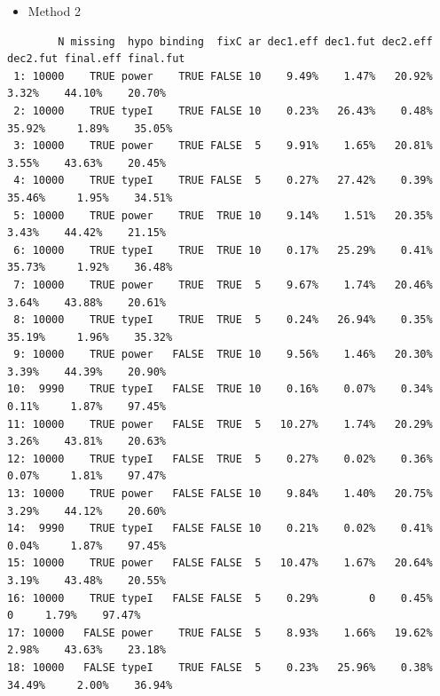 \documentclass[12pt]{article}
\begin{document}
\begin{itemize}
\item Method 2
\end{itemize}
\begin{verbatim}
        N missing  hypo binding  fixC ar dec1.eff dec1.fut dec2.eff dec2.fut final.eff final.fut
 1: 10000    TRUE power    TRUE FALSE 10    9.49%    1.47%   20.92%    3.32%    44.10%    20.70%
 2: 10000    TRUE typeI    TRUE FALSE 10    0.23%   26.43%    0.48%   35.92%     1.89%    35.05%
 3: 10000    TRUE power    TRUE FALSE  5    9.91%    1.65%   20.81%    3.55%    43.63%    20.45%
 4: 10000    TRUE typeI    TRUE FALSE  5    0.27%   27.42%    0.39%   35.46%     1.95%    34.51%
 5: 10000    TRUE power    TRUE  TRUE 10    9.14%    1.51%   20.35%    3.43%    44.42%    21.15%
 6: 10000    TRUE typeI    TRUE  TRUE 10    0.17%   25.29%    0.41%   35.73%     1.92%    36.48%
 7: 10000    TRUE power    TRUE  TRUE  5    9.67%    1.74%   20.46%    3.64%    43.88%    20.61%
 8: 10000    TRUE typeI    TRUE  TRUE  5    0.24%   26.94%    0.35%   35.19%     1.96%    35.32%
 9: 10000    TRUE power   FALSE  TRUE 10    9.56%    1.46%   20.30%    3.39%    44.39%    20.90%
10:  9990    TRUE typeI   FALSE  TRUE 10    0.16%    0.07%    0.34%    0.11%     1.87%    97.45%
11: 10000    TRUE power   FALSE  TRUE  5   10.27%    1.74%   20.29%    3.26%    43.81%    20.63%
12: 10000    TRUE typeI   FALSE  TRUE  5    0.27%    0.02%    0.36%    0.07%     1.81%    97.47%
13: 10000    TRUE power   FALSE FALSE 10    9.84%    1.40%   20.75%    3.29%    44.12%    20.60%
14:  9990    TRUE typeI   FALSE FALSE 10    0.21%    0.02%    0.41%    0.04%     1.87%    97.45%
15: 10000    TRUE power   FALSE FALSE  5   10.47%    1.67%   20.64%    3.19%    43.48%    20.55%
16: 10000    TRUE typeI   FALSE FALSE  5    0.29%        0    0.45%        0     1.79%    97.47%
17: 10000   FALSE power    TRUE FALSE  5    8.93%    1.66%   19.62%    2.98%    43.63%    23.18%
18: 10000   FALSE typeI    TRUE FALSE  5    0.23%   25.96%    0.38%   34.49%     2.00%    36.94%
\end{verbatim}

\clearpage
\end{document}
